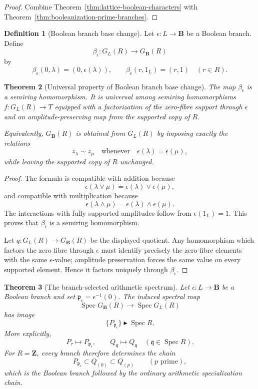 \documentclass[11pt]{amsart}
\numberwithin{equation}{section}
\newtheorem{theorem}{Theorem}[section]
\theoremstyle{definition}
\newtheorem{definition}[theorem]{Definition}
\newcommand{\B}{\mathbf B}
\newcommand{\Z}{\mathbf Z}
\newcommand{\Spec}{\operatorname{Spec}}
\begin{document}
\begin{proof}
Combine Theorem~\ref{thm:lattice-boolean-characters} with
Theorem~\ref{thm:booleanization-prime-branches}.
\end{proof}

\begin{definition}[Boolean branch base change]
\label{def:boolean-branch-base-change}
Let $\epsilon:L\to\B$ be a Boolean branch.  Define
\[
\beta_\epsilon:G_L(R)\longrightarrow G_{\B}(R)
\]
by
\[
\beta_\epsilon(0,\lambda)=(0,\epsilon(\lambda)),
\qquad
\beta_\epsilon(r,1_L)=(r,1)
\quad(r\in R).
\]
\end{definition}

\begin{theorem}[Universal property of Boolean branch base change]
\label{thm:boolean-branch-base-change}
The map $\beta_\epsilon$ is a semiring homomorphism.  It is universal
among semiring homomorphisms $f:G_L(R)\to T$ equipped with a factorization
of the zero-fibre support through $\epsilon$ and an amplitude-preserving
map from the supported copy of $R$.

Equivalently, $G_{\B}(R)$ is obtained from $G_L(R)$ by imposing exactly the
relations
\[
z_\lambda\sim z_\mu
\quad\text{whenever}\quad
\epsilon(\lambda)=\epsilon(\mu),
\]
while leaving the supported copy of $R$ unchanged.
\end{theorem}

\begin{proof}
The formula is compatible with addition because
\[
\epsilon(\lambda\vee\mu)=\epsilon(\lambda)\vee\epsilon(\mu),
\]
and compatible with multiplication because
\[
\epsilon(\lambda\wedge\mu)=\epsilon(\lambda)\wedge\epsilon(\mu).
\]
The interactions with fully supported amplitudes follow from
$\epsilon(1_L)=1$.  This proves that $\beta_\epsilon$ is a semiring
homomorphism.

Let $q:G_L(R)\to G_\B(R)$ be the displayed quotient.  Any homomorphism
which factors the zero fibre through $\epsilon$ must identify precisely the
zero-fibre elements with the same $\epsilon$-value; amplitude preservation
forces the same value on every supported element.  Hence it factors
uniquely through $\beta_\epsilon$.
\end{proof}

\begin{theorem}[The branch-selected arithmetic spectrum]
\label{thm:branch-selected-spectrum}
Let $\epsilon:L\to\B$ be a Boolean branch and set
$\mathfrak p_\epsilon=\epsilon^{-1}(0)$.  The induced spectral map
\[
\Spec G_{\B}(R)\longrightarrow\Spec G_L(R)
\]
has image
\[
\boxed{
\{P_{\mathfrak p_\epsilon}\}\blacktriangleright\Spec R.
}
\]
More explicitly,
\[
P_\tau\longmapsto P_{\mathfrak p_\epsilon},
\qquad
Q_{\mathfrak q}\longmapsto Q_{\mathfrak q}
\quad(\mathfrak q\in\Spec R).
\]
For $R=\Z$, every branch therefore determines the chain
\[
P_{\mathfrak p_\epsilon}
\subset
Q_{(0)}
\subset
Q_{(p)}
\qquad(p\text{ prime}),
\]
which is the Boolean branch followed by the ordinary arithmetic
specialization chain.
\end{theorem}
\end{document}
